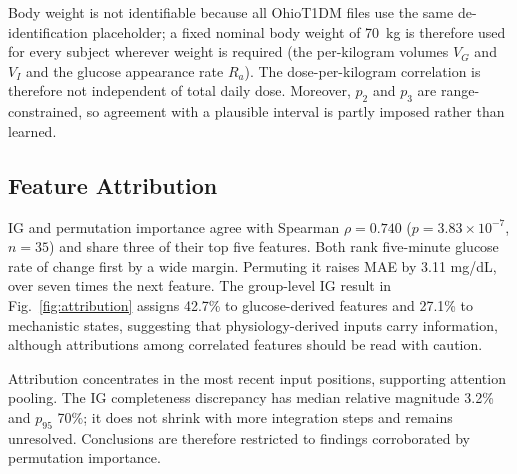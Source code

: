 \documentclass[journal]{IEEEtran}
\begin{document}
Body weight is not identifiable because all OhioT1DM files use the same de-identification placeholder; a fixed nominal body weight of 70~kg is therefore used for every subject wherever weight is required (the per-kilogram volumes $V_G$ and $V_I$ and the glucose appearance rate $R_a$). The dose-per-kilogram correlation is therefore not independent of total daily dose. Moreover, $p_2$ and $p_3$ are range-constrained, so agreement with a plausible interval is partly imposed rather than learned.

\subsection{Feature Attribution}
\label{sec:attribution}

IG and permutation importance agree with Spearman $\rho = 0.740$ ($p = 3.83 \times 10^{-7}$, $n=35$) and share three of their top five features. Both rank five-minute glucose rate of change first by a wide margin. Permuting it raises MAE by 3.11 mg/dL, over seven times the next feature. The group-level IG result in Fig.~\ref{fig:attribution} assigns 42.7\% to glucose-derived features and 27.1\% to mechanistic states, suggesting that physiology-derived inputs carry information, although attributions among correlated features should be read with caution.

Attribution concentrates in the most recent input positions, supporting attention pooling. The IG completeness discrepancy has median relative magnitude 3.2\% and $p_{95}$ 70\%; it does not shrink with more integration steps and remains unresolved. Conclusions are therefore restricted to findings corroborated by permutation importance.
\end{document}

